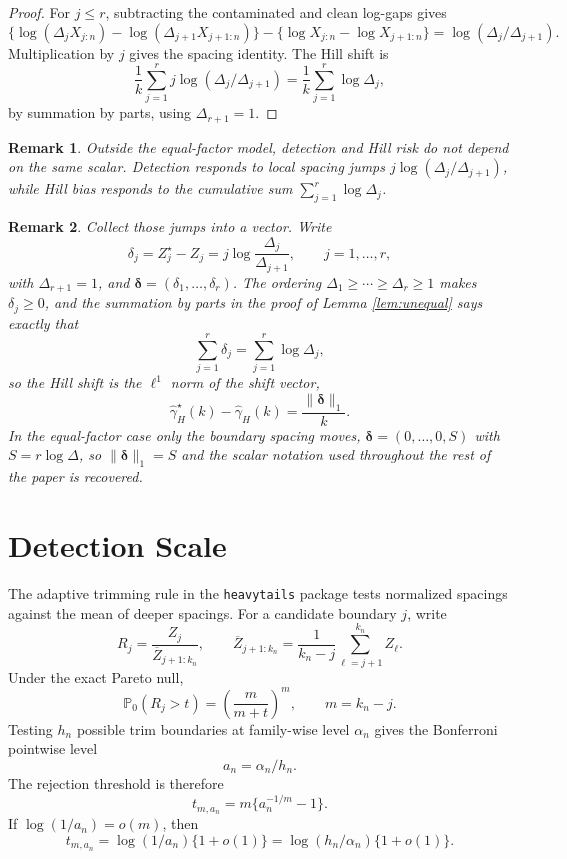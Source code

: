 \documentclass[11pt]{article}
\newtheorem{remark}{Remark}
\newcommand{\Pp}{\mathbb{P}}
\newcommand{\ghat}{\widehat{\gamma}}
\begin{document}
\begin{proof}
For $j\le r$, subtracting the contaminated and clean log-gaps gives
\[
  \{\log(\Delta_jX_{j:n})-\log(\Delta_{j+1}X_{j+1:n})\}
  -
  \{\log X_{j:n}-\log X_{j+1:n}\}
  =
  \log(\Delta_j/\Delta_{j+1}).
\]
Multiplication by $j$ gives the spacing identity.  The Hill shift is
\[
  \frac1k\sum_{j=1}^{r}j\log(\Delta_j/\Delta_{j+1})
  =
  \frac1k\sum_{j=1}^{r}\log\Delta_j,
\]
by summation by parts, using $\Delta_{r+1}=1$.
\end{proof}

\begin{remark}
Outside the equal-factor model, detection and Hill risk do not depend on the
same scalar.  Detection responds to local spacing jumps
$j\log(\Delta_j/\Delta_{j+1})$, while Hill bias responds to the cumulative
sum $\sum_{j=1}^r\log\Delta_j$.
\end{remark}

\begin{remark}
\label{rem:delta}
Collect those jumps into a vector.  Write
\[
  \delta_j
  =
  Z_j^\star-Z_j
  =
  j\log\frac{\Delta_j}{\Delta_{j+1}},
  \qquad j=1,\ldots,r,
\]
with $\Delta_{r+1}=1$, and $\boldsymbol\delta=(\delta_1,\ldots,\delta_r)$.
The ordering $\Delta_1\ge\cdots\ge\Delta_r\ge1$ makes $\delta_j\ge0$, and the
summation by parts in the proof of Lemma \ref{lem:unequal} says exactly that
\[
  \sum_{j=1}^r\delta_j=\sum_{j=1}^r\log\Delta_j,
\]
so the Hill shift is the $\ell^1$ norm of the shift vector,
\[
  \ghat_H^\star(k)-\ghat_H(k)
  =
  \frac{\|\boldsymbol\delta\|_1}{k}.
\]
In the equal-factor case only the boundary spacing moves,
$\boldsymbol\delta=(0,\ldots,0,S)$ with $S=r\log\Delta$, so
$\|\boldsymbol\delta\|_1=S$ and the scalar notation used throughout the rest
of the paper is recovered.
\end{remark}

\section{Detection Scale}
\label{sec:detection-scale}

The adaptive trimming rule in the \texttt{heavytails} package tests
normalized spacings against
the mean of deeper spacings.  For a candidate boundary $j$, write
\[
  R_j=\frac{Z_j}{\overline Z_{j+1:k_n}},
  \qquad
  \overline Z_{j+1:k_n}=\frac1{k_n-j}\sum_{\ell=j+1}^{k_n}Z_\ell.
\]
Under the exact Pareto null,
\[
  \Pp_0(R_j>t)
  =
  \left(\frac{m}{m+t}\right)^m,
  \qquad m=k_n-j.
\]
Testing $h_n$ possible trim boundaries at family-wise level $\alpha_n$ gives
the Bonferroni pointwise level
\[
  a_n=\alpha_n/h_n.
\]
The rejection threshold is therefore
\[
  t_{m,a_n}
  =
  m\{a_n^{-1/m}-1\}.
\]
If $\log(1/a_n)=o(m)$, then
\[
  t_{m,a_n}
  =
  \log(1/a_n)\{1+o(1)\}
  =
  \log(h_n/\alpha_n)\{1+o(1)\}.
\]
\end{document}
